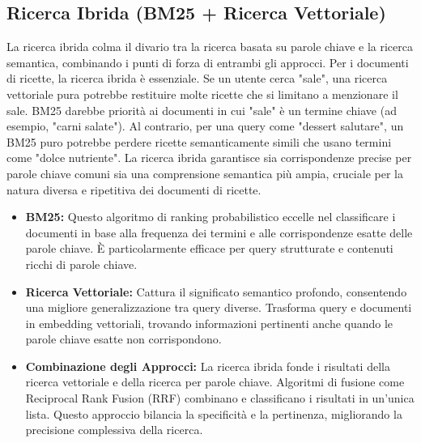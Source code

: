 \documentclass[a4paper, 11pt]{article}
\begin{document}
\subsection{Ricerca Ibrida (BM25 + Ricerca Vettoriale)}
La ricerca ibrida colma il divario tra la ricerca basata su parole chiave e la ricerca semantica, combinando i punti di forza di entrambi gli approcci. \cite{hybrid_search_vectorchord} Per i documenti di ricette, la ricerca ibrida è essenziale. Se un utente cerca "sale", una ricerca vettoriale pura potrebbe restituire molte ricette che si limitano a menzionare il sale. BM25 \cite{hybrid_search_vectorchord} darebbe priorità ai documenti in cui "sale" è un termine chiave (ad esempio, "carni salate"). Al contrario, per una query come "dessert salutare", un BM25 puro potrebbe perdere ricette semanticamente simili che usano termini come "dolce nutriente". La ricerca ibrida garantisce sia corrispondenze precise per parole chiave comuni sia una comprensione semantica più ampia, cruciale per la natura diversa e ripetitiva dei documenti di ricette.
\begin{itemize}
    \item \textbf{BM25:} Questo algoritmo di ranking probabilistico eccelle nel classificare i documenti in base alla frequenza dei termini e alle corrispondenze esatte delle parole chiave. \cite{hybrid_search_vectorchord} È particolarmente efficace per query strutturate e contenuti ricchi di parole chiave.
    \item \textbf{Ricerca Vettoriale:} Cattura il significato semantico profondo, consentendo una migliore generalizzazione tra query diverse. \cite{hybrid_search_vectorchord} Trasforma query e documenti in embedding vettoriali, trovando informazioni pertinenti anche quando le parole chiave esatte non corrispondono.
    \item \textbf{Combinazione degli Approcci:} La ricerca ibrida fonde i risultati della ricerca vettoriale e della ricerca per parole chiave. Algoritmi di fusione come Reciprocal Rank Fusion (RRF) combinano e classificano i risultati in un'unica lista. \cite{hybrid_search_vectorchord} Questo approccio bilancia la specificità e la pertinenza, migliorando la precisione complessiva della ricerca.
\end{itemize}
\end{document}
